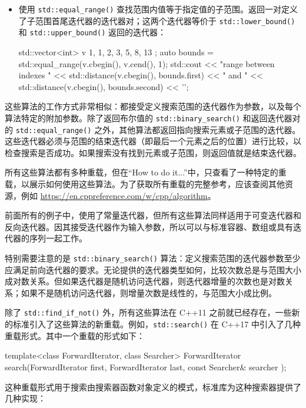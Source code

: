 \begin{itemize}
\item
使用 \verb|std::equal_range()| 查找范围内值等于指定值的子范围。返回一对定义了子范围首尾迭代器的迭代器对；这两个迭代器等价于 \verb|std::lower_bound()| 和 \verb|std::upper_bound()| 返回的迭代器：

\begin{cpp}
std::vector<int> v{ 1, 1, 2, 3, 5, 8, 13 };
auto bounds = std::equal_range(v.cbegin(), v.cend(), 1);
std::cout << "range between indexes "
          << std::distance(v.cbegin(), bounds.first)
          << " and "
          << std::distance(v.cbegin(), bounds.second)
          << '\n';
\end{cpp}
\end{itemize}


这些算法的工作方式非常相似：都接受定义搜索范围的迭代器作为参数，以及每个算法特定的附加参数。除了返回布尔值的 \verb|std::binary_search()| 和返回迭代器对的 \verb|std::equal_range()| 之外，其他算法都返回指向搜索元素或子范围的迭代器。这些迭代器必须与范围的结束迭代器（即最后一个元素之后的位置）进行比较，以检查搜索是否成功。如果搜索没有找到元素或子范围，则返回值就是结束迭代器。

所有这些算法都有多种重载，但在“How to do it...”中，只查看了一种特定的重载，以展示如何使用这些算法。为了获取所有重载的完整参考，应该查阅其他资源，例如 \url{https://en.cppreference.com/w/cpp/algorithm}。

前面所有的例子中，使用了常量迭代器，但所有这些算法同样适用于可变迭代器和反向迭代器。因其接受迭代器作为输入参数，所以可以与标准容器、数组或具有迭代器的序列一起工作。

特别需要注意的是 \verb|std::binary_search()| 算法：定义搜索范围的迭代器参数至少应满足前向迭代器的要求。无论提供的迭代器类型如何，比较次数总是与范围大小成对数关系。但如果迭代器是随机访问迭代器，则迭代器增量的次数也是对数关系；如果不是随机访问迭代器，则增量次数是线性的，与范围大小成比例。

除了 \verb|std::find_if_not()| 外，所有这些算法在 C++11 之前就已经存在，一些新的标准引入了这些算法的新重载。例如，\verb|std::search()| 在 C++17 中引入了几种重载形式。其中一个重载的形式如下：

\begin{cpp}
template<class ForwardIterator, class Searcher>
ForwardIterator search(ForwardIterator first, ForwardIterator last,
    const Searcher& searcher );
\end{cpp}

这种重载形式用于搜索由搜索器函数对象定义的模式，标准库为这种搜索器提供了几种实现：

